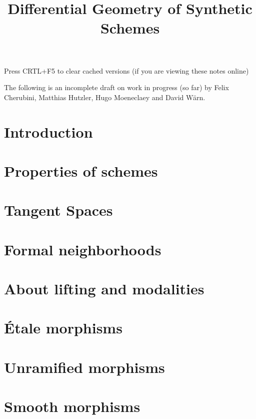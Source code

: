 \documentclass{../util/zariski}
\title{Differential Geometry of Synthetic Schemes}
\begin{document}
\maketitle

\begin{center}
  \color{purple}
  \large{Press CRTL+F5 to clear cached versions}
  \large{(if you are viewing these notes online)}
\end{center}

The following is an incomplete draft on work in progress (so far)
by Felix Cherubini, Matthias Hutzler, Hugo Moeneclaey and David Wärn.

\tableofcontents

\section*{Introduction}


\section{Properties of schemes}


\section{Tangent Spaces}



\section{Formal neighborhoods}


\section{About lifting and modalities}


\section{Étale morphisms}


\section{Unramified morphisms}


\section{Smooth morphisms}

\end{document}
